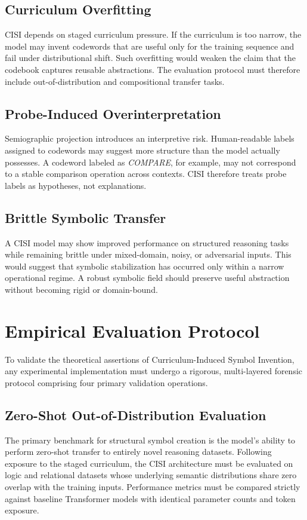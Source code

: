 \section{Curriculum Overfitting}
CISI depends on staged curriculum pressure. If the curriculum is too narrow, the model may invent codewords that are useful only for the training sequence and fail under distributional shift. Such overfitting would weaken the claim that the codebook captures reusable abstractions. The evaluation protocol must therefore include out-of-distribution and compositional transfer tasks.
\section{Probe-Induced Overinterpretation}
Semiographic projection introduces an interpretive risk. Human-readable labels assigned to codewords may suggest more structure than the model actually possesses. A codeword labeled as \textit{COMPARE}, for example, may not correspond to a stable comparison operation across contexts. CISI therefore treats probe labels as hypotheses, not explanations.
\section{Brittle Symbolic Transfer}
A CISI model may show improved performance on structured reasoning tasks while remaining brittle under mixed-domain, noisy, or adversarial inputs. This would suggest that symbolic stabilization has occurred only within a narrow operational regime. A robust symbolic field should preserve useful abstraction without becoming rigid or domain-bound.

\chapter{Empirical Evaluation Protocol}

To validate the theoretical assertions of Curriculum-Induced Symbol Invention, any experimental implementation must undergo a rigorous, multi-layered forensic protocol comprising four primary validation operations.

\section{Zero-Shot Out-of-Distribution Evaluation}
The primary benchmark for structural symbol creation is the model's ability to perform zero-shot transfer to entirely novel reasoning datasets. Following exposure to the staged curriculum, the CISI architecture must be evaluated on logic and relational datasets whose underlying semantic distributions share zero overlap with the training inputs. Performance metrics must be compared strictly against baseline Transformer models with identical parameter counts and token exposure.

